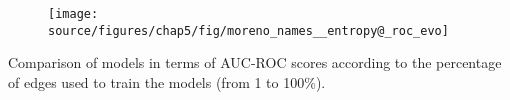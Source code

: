 \begin{subfigure}                                                           
         \centering                                                         
      \texttt{[image: source/figures/chap5/fig/moreno\_names\_\_entropy@\_roc\_evo]}
\end{subfigure}                                                             
\caption{Comparison of models in terms of AUC-ROC scores according to the percentage of edges used to train the models (from 1 to 100\%).}

